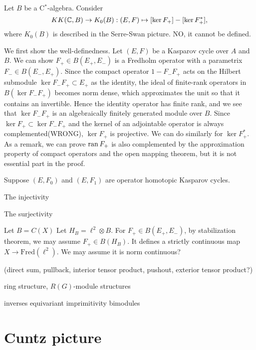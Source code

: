 \documentclass{../../large}
\begin{document}
\begin{prb}
Let $B$ be a C$^*$-algebra.
Consider
\[KK(\mathbb{C},B)\to K_0(B):(E,F)\mapsto[\ker F_+]-[\ker F_+^*],\]
where $K_0(B)$ is described in the Serre-Swan picture.
NO, it cannot be defined.
\end{prb}
\begin{pf}
We first show the well-definedness.
Let $(E,F)$ be a Kasparov cycle over $A$ and $B$.
We can show $F_+\in B(E_+,E_-)$ is a Fredholm operator with a parametrix $F_-\in B(E_-,E_+)$.
Since the compact operator $1-F_-F_+$ acts on the Hilbert submodule $\ker F_-F_+\subset E_+$ as the identity, the ideal of finite-rank operators in $B(\ker F_-F_+)$ becomes norm dense, which approximates the unit so that it contains an invertible.
Hence the identity operator has finite rank, and we see that $\ker F_-F_+$ is an algebraically finitely generated module over $B$.
Since $\ker F_+\subset\ker F_-F_+$ and the kernel of an adjointable operator is always complemented(WRONG), $\ker F_+$ is projective.
We can do similarly for $\ker F_+^*$.
As a remark, we can prove $\operatorname{ran} F_+$ is also complemented by the approximation property of compact operators and the open mapping theorem, but it is not essential part in the proof.

Suppose $(E,F_0)$ and $(E,F_1)$ are operator homotopic Kasparov cycles.


The injectivity

The surjectivity

\end{pf}

\begin{prb}
\end{prb}
\begin{pf}
Let $B=C(X)$
Let $H_B=\ell^2\otimes B$.
For $F_+\in B(E_+,E_-)$, by stabilization theorem, we may assume $F_+\in B(H_B)$.
It defines a strictly continuous map $X\to\mathrm{Fred}(\ell^2)$.
We may assume it is norm continuous?
\end{pf}

(direct sum, pullback, interior tensor product, pushout, exterior tensor product?)

ring structure, $R(G)$-module structures




inverses
equivariant imprimitivity bimodules






\section{Cuntz picture}
\end{document}

